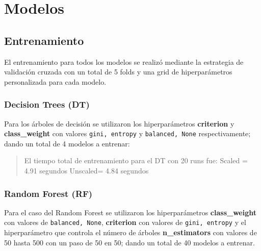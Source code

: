 \documentclass[
  10pt,
]{article}
\begin{document}
\section{Modelos}\label{modelos}

\subsection{Entrenamiento}\label{entrenamiento}

El entrenamiento para todos los modelos se realizó mediante la
estrategia de validación cruzada con un total de 5 folds y una grid de
hiperparámetros personalizada para cada modelo.

\subsubsection{Decision Trees (DT)}\label{decision-trees-dt}

Para los árboles de decisión se utilizaron los hiperparámetros
\textbf{criterion} y \textbf{class\_weight} con valores
\texttt{gini,\ entropy} y \texttt{balanced,\ None} respectivamente;
dando un total de 4 modelos a entrenar:

\begin{table}[!h]
\centering
\caption{\label{tab:grid_DT}Grid de entrenamiento usada para los arboles de desición}
\centering
{}
\end{table}

\begin{quote}
El tiempo total de entrenamiento para el DT con 20 runs fue: Scaled =
4.91 segundos Unscaled= 4.84 segundos
\end{quote}

\subsubsection{Random Forest (RF)}\label{random-forest-rf}

Para el caso del Random Forest se utilizaron los hiperparámetros
\textbf{class\_weight} con valores de \texttt{balanced,\ None},
\textbf{criterion} con valores de \texttt{gini,\ entropy} y el
hiperparámetro que controla el número de árboles \textbf{n\_estimators}
con valores de 50 hasta 500 con un paso de 50 en 50; dando un total de
40 modelos a entrenar.
\end{document}
